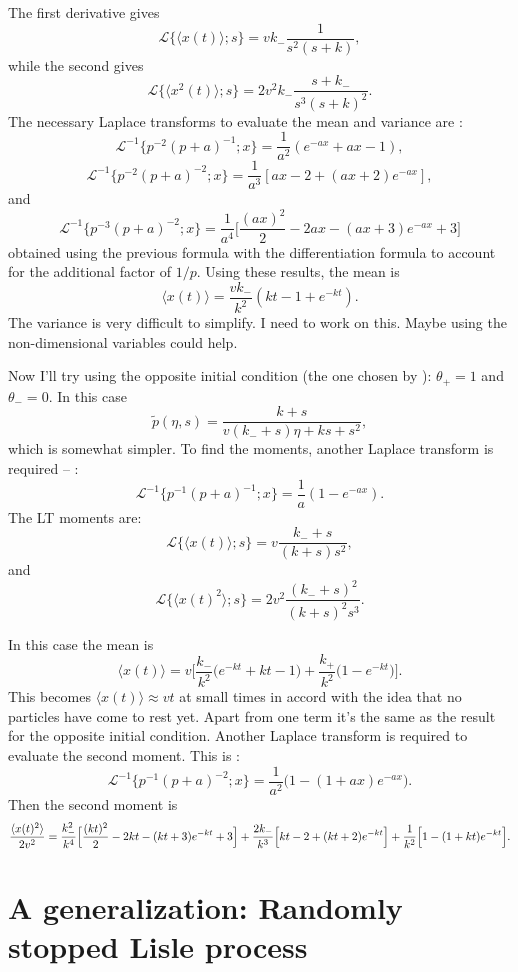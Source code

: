 \documentclass[11pt]{article}
\newcommand\be{\begin{equation}} %
\newcommand\ee{\end{equation}}   %
\newcommand\bra{\langle}
\newcommand\ket{\rangle}
\newcommand\El{\mathcal{L}}
\begin{document}
The first derivative gives 
\be \El\{\bra x(t) \ket;s\} = vk_- \frac{1}{s^2(s+k)},\ee
while the second gives 
\be \El\{\bra x^2(t) \ket ; s\} = 2 v^2 k_- \frac{s+k_-}{s^3(s+k)^2}. \ee
The necessary Laplace transforms to evaluate the mean and variance are \citep[][2.1.2.33]{Prudnikov1986}:
\be \El^{-1}\Big\{p^{-2}(p+a)^{-1};x\Big\} = \frac{1}{a^2}(e^{-ax}+ax-1),\ee
\citep[][2.1.2.49]{Prudnikov1986}
\be \El^{-1}\Big\{p^{-2}(p+a)^{-2};x\Big\} = \frac{1}{a^3}[ax - 2 + (ax+2)e^{-ax}],\ee
and 
\be \El^{-1}\Big\{p^{-3}(p+a)^{-2};x\Big\} = \frac{1}{a^4}\Big[\frac{(ax)^2}{2} - 2ax - (ax+3)e^{-ax} + 3\Big] \ee
obtained using the previous formula with the differentiation formula to account for the additional factor of $1/p$.
Using these results, the mean is 
\be \bra x(t) \ket = \frac{vk_-}{k^2}(kt -1 + e^{-kt}).\ee
The variance is very difficult to simplify. I need to work on this. Maybe using the non-dimensional variables could help.

Now I'll try using the opposite initial condition (the one chosen by \citet{Lisle1998}): $\theta_+ = 1$ and $\theta_- = 0$.
In this case
\be \tilde{p}(\eta,s) = \frac{k+s}{v(k_-+s)\eta + ks + s^2},\ee
which is somewhat simpler.
To find the moments, another Laplace transform is required --  \citet[][2.1.2.31]{Prudnikov1986}:
\be \El^{-1}\Big\{p^{-1}(p+a)^{-1};x\Big\} = \frac{1}{a}(1-e^{-ax}).\ee
The LT moments are:
\be \El\{\bra x(t) \ket; s\} = v\frac{k_-+s}{(k+s)s^2},\ee
and
\be \El\{\bra x(t)^2\ket;s\} = 2v^2 \frac{(k_-+s)^2}{(k+s)^2s^3}.
\ee

In this case the mean is
\be \bra x(t) \ket = v\Big[ \frac{k_-}{k^2}\big(e^{-kt}+kt -1\big) + \frac{k_+}{k^2}\big(1-e^{-kt}\big)\Big].\ee
This becomes $\bra x(t) \ket \approx vt$ at small times in accord with the idea that no particles have come to rest yet.
Apart from one term it's the same as the result for the opposite initial condition.
Another Laplace transform is required to evaluate the second moment.
This is \citet[][2.1.2.47]{Prudnikov1986}:
\be \El^{-1}\Big\{p^{-1}(p+a)^{-2};x\Big\} = \frac{1}{a^2}\Big(1 -(1+ax)e^{-ax}\Big).\ee
Then the second moment is
\be
\frac{\bra x(t)^2 \ket}{2v^2} = \frac{k_-^2}{k^4}\Big[\frac{(kt)^2}{2} - 2kt -(kt+3)e^{-kt} + 3 \Big] + \frac{2k_-}{k^3}\Big[kt -2 + (kt +2)e^{-kt} \Big] \\+ \frac{1}{k^2}\Big[ 1 - (1+kt)e^{-kt} \Big].
\ee
\section{A generalization: Randomly stopped Lisle process}
\end{document}
